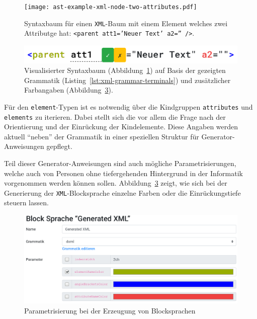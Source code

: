 \documentclass[paper=a4,fontsize=11pt,parskip=half]{scrartcl}
\begin{document}
\begin{figure}[p]
  \centering\texttt{[image: ast-example-xml-node-two-attributes.pdf]}
  \caption{Syntaxbaum für einen \texttt{XML}-Baum mit einem Element welches zwei Attributge hat: \texttt{<parent att1='Neuer Text' a2='' />}.}
  \label{fig:ast-example-xml-node-two-attributes}
\end{figure}

\begin{figure}[p]
  \centering\includegraphics[width=\linewidth]{screenshot-generated-xml.png}
  \caption{Visualisierter Syntaxbaum (Abbildung~\ref{fig:ast-example-xml-node-two-attributes}) auf Basis der gezeigten Grammatik (Listing~\ref{lst:xml-grammar-terminals}) und zusätzlicher Farbangaben (Abbildung~\ref{fig:block-lang-generation-parameters}).}
  \label{fig:example-xml-generated}
\end{figure}

Für den \texttt{element}-Typen ist es notwendig über die Kindgruppen \texttt{attributes} und \texttt{elements} zu iterieren. Dabei stellt sich die vor allem die Frage nach der Orientierung und der Einrückung der Kindelemente. Diese Angaben werden aktuell \enquote{neben} der Grammatik in einer speziellen Struktur für Generator-Anweisungen gepflegt.

Teil dieser Generator-Anweisungen sind auch mögliche Parametrisierungen, welche auch von Personen ohne tiefergehenden Hintergrund in der Informatik vorgenommen werden können sollen. Abbildung~\ref{fig:block-lang-generation-parameters} zeigt, wie sich bei der Generierung der \texttt{XML}-Blocksprache einzelne Farben oder die Einrückungstiefe steuern lassen.

\begin{figure}[p]
  \centering\includegraphics[width=\linewidth]{screenshot-generation-parameters.png}
  \caption{Parametrisierung bei der Erzeugung von Blocksprachen}
  \label{fig:block-lang-generation-parameters}
\end{figure}
\end{document}
